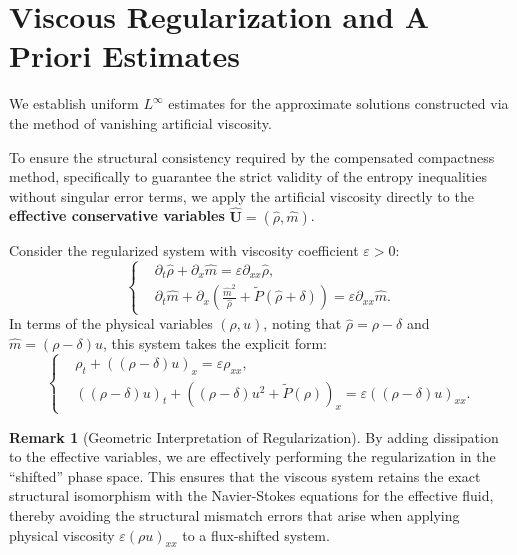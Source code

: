 \documentclass[12pt, reqno]{article}
\theoremstyle{definition}
\newtheorem{remark}[theorem]{Remark}
\newcommand{\pa}{\partial}
\numberwithin{equation}{section}
\begin{document}


\section{Viscous Regularization and A Priori Estimates}
\label{sec:estimates}

We establish uniform $L^\infty$ estimates for the approximate solutions constructed via the method of vanishing artificial viscosity. 

To ensure the structural consistency required by the compensated compactness method, specifically to guarantee the strict validity of the entropy inequalities without singular error terms, we apply the artificial viscosity directly to the \textbf{effective conservative variables} $\hat{\mathbf{U}} = (\hat{\rho}, \hat{m})$.

Consider the regularized system with viscosity coefficient $\varepsilon > 0$:
\begin{equation}\label{eq:viscous}
\left\{
\begin{aligned}
    & \pa_t \hat{\rho} + \pa_x \hat{m} = \varepsilon \pa_{xx} \hat{\rho}, \\
    & \pa_t \hat{m} + \pa_x \left( \frac{\hat{m}^2}{\hat{\rho}} + \tilde{P}(\hat{\rho}+\delta) \right) = \varepsilon \pa_{xx} \hat{m}.
\end{aligned}
\right.
\end{equation}
In terms of the physical variables $(\rho, u)$, noting that $\hat{\rho} = \rho - \delta$ and $\hat{m} = (\rho-\delta)u$, this system takes the explicit form:
\begin{equation}\label{eq:viscous_physical}
\left\{
\begin{aligned}
    & \rho_t + \left( (\rho-\delta) u \right)_x = \varepsilon\rho_{xx},\\
    & ((\rho-\delta) u)_t + \left( (\rho-\delta) u^2 + \tilde{P}(\rho) \right)_x = \varepsilon((\rho-\delta) u)_{xx}.
\end{aligned}
\right.
\end{equation}
\begin{remark}[Geometric Interpretation of Regularization]
By adding dissipation to the effective variables, we are effectively performing the regularization in the ``shifted'' phase space. This ensures that the viscous system retains the exact structural isomorphism with the Navier-Stokes equations for the effective fluid, thereby avoiding the structural mismatch errors that arise when applying physical viscosity $\varepsilon(\rho u)_{xx}$ to a flux-shifted system.
\end{remark}
\end{document}
